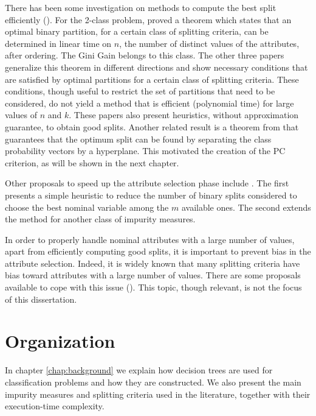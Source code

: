 There has been  some investigation on 
methods to compute the best split efficiently 
(\cite{Breiman84,Chou:91,BPKN:92,journals/datamine/CoppersmithHH99}).
For the 2-class problem,  \cite{Breiman84} proved a theorem which states that an optimal
binary partition, for a certain class of splitting criteria,
can be determined in linear time on $n$, the number of distinct values of the attributes, after ordering.
The Gini  Gain belongs to this class.
The  other  three papers generalize
this theorem  in different directions 
and show necessary conditions that are satisfied by optimal partitions for a certain class of splitting criteria. 
These conditions, though useful to restrict the set of partitions
that need to be considered, do not yield  a method that
is efficient (polynomial time) for large values of $n$ and $k$. These papers also  present  heuristics, without approximation guarantee, to obtain good splits.
Another related result is a theorem from \cite{journals/datamine/CoppersmithHH99} that guarantees that the optimum split can be found by separating the class probability vectors by a hyperplane. This motivated the creation of the PC criterion, as will be shown in the next chapter.

Other proposals to  speed up the attribute selection phase
 include  \cite{MolaSiciliano1997,Shih2001}. 
The first presents a simple  heuristic
to reduce the number of binary splits considered to
choose the best nominal variable among the $m$ available ones.
 The second   extends the method for another class
of impurity measures.

In order to properly
handle nominal attributes with a large number of values,
apart from efficiently computing good splits, it is
important to prevent bias in the attribute selection.
Indeed, it is widely  known that many splitting criteria have bias toward
attributes with a large number of values. There are some  proposals available
to cope with this issue 
(\cite{conf/icml/DobraG01,Shih2004,Hothorn:2006:URP}). 
This topic, though relevant, is not the focus of this dissertation.

\section{Organization}
\label{sec:organization}
In chapter \ref{chap:background} we explain how decision trees are used for classification problems and how they are constructed. We also present the main impurity measures and splitting criteria used in the literature, together with their execution-time complexity.

